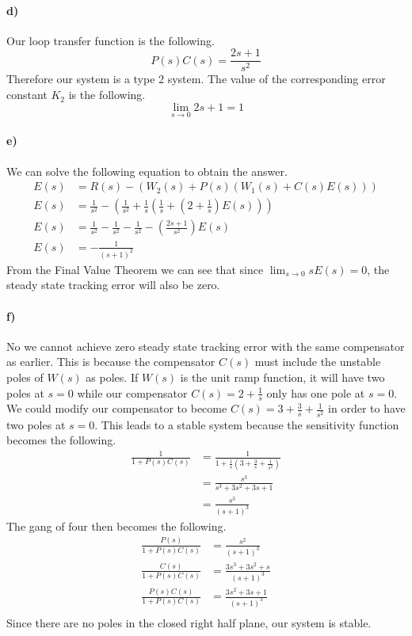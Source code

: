 \documentclass[12pt]{article}
\begin{document}
\paragraph{d)}

Our loop transfer function is the following.
\[P(s)C(s)=\frac{2s+1}{s^2}\]
Therefore our system is a type 2 system. The value of the corresponding error constant \(K_2\) is the following.
\[\lim_{s\to0} 2s+1 = 1\]

\paragraph{e)}

We can solve the following equation to obtain the answer.
\begin{align*}
    E(s)&=R(s)-(W_2(s)+P(s)(W_1(s)+C(s)E(s)))\\
    E(s)&=\frac{1}{s^2}-\left(\frac{1}{s^2}+\frac{1}{s}\left(\frac{1}{s}+\left(2+\frac{1}{s}\right)E(s)\right)\right)\\
    E(s)&=\frac{1}{s^2}-\frac{1}{s^2}-\frac{1}{s^2}-\left(\frac{2s+1}{s^2}\right)E(s)\\
    E(s)&=-\frac{1}{(s+1)^2}
\end{align*}
From the Final Value Theorem we can see that since \(\lim_{s\to0} sE(s)=0\), the steady state tracking
error will also be zero.

\paragraph{f)}

No we cannot achieve zero steady state tracking error with the same compensator as earlier. This is because the
compensator \(C(s)\) must include the unstable poles of \(W(s)\) as poles. If \(W(s)\) is the unit ramp function,
it will have two poles at \(s=0\) while our compensator \(C(s)=2+\frac{1}{s}\) only has one pole at \(s=0\).
We could modify our compensator to become \(C(s)=3+\frac{3}{s}+\frac{1}{s^2}\) in order to have two poles at
\(s=0\). This leads to a stable system because the sensitivity function becomes the following.
\begin{align*}
    \frac{1}{1+P(s)C(s)}&=\frac{1}{1+\frac{1}{s}\left(3+\frac{3}{s}+\frac{1}{s^2}\right)}\\
    &=\frac{s^3}{s^3+3s^2+3s+1}\\
    &=\frac{s^3}{(s+1)^3}
\end{align*}
The gang of four then becomes the following.
\begin{align*}
    \frac{P(s)}{1+P(s)C(s)}&=\frac{s^2}{(s+1)^3}\\
    \frac{C(s)}{1+P(s)C(s)}&=\frac{3s^3+3s^2+s}{(s+1)^3}\\
    \frac{P(s)C(s)}{1+P(s)C(s)}&=\frac{3s^2+3s+1}{(s+1)^3}\\
\end{align*}
Since there are no poles in the closed right half plane, our system is stable.
\end{document}
